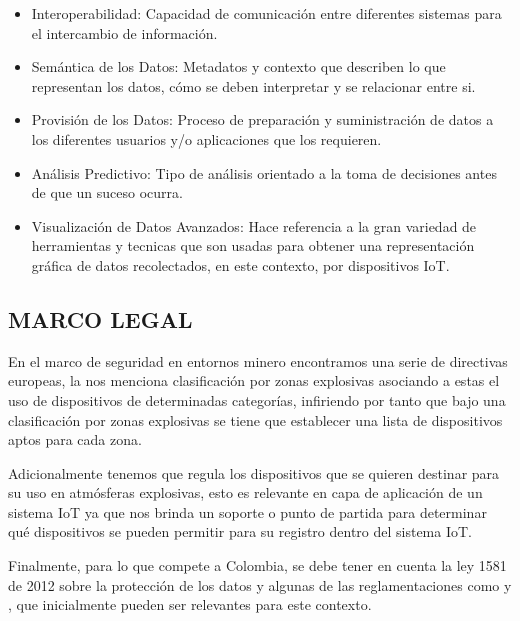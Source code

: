 \documentclass[stu,12pt,floatsintext]{apa7}
\begin{document}
\begin{itemize}
		\item Interoperabilidad: Capacidad de comunicación entre diferentes sistemas para el intercambio de información.
		\item Semántica de los Datos: Metadatos y contexto que describen lo que representan los datos, cómo se deben interpretar y se relacionar entre si.
		\item Provisión de los Datos: Proceso de preparación y suministración de datos a los diferentes usuarios y/o aplicaciones que los requieren.
		\item Análisis Predictivo: Tipo de análisis orientado a la toma de decisiones antes de que un suceso ocurra.
		\item Visualización de Datos Avanzados: Hace referencia a la gran variedad de herramientas y tecnicas que son usadas para obtener una representación gráfica de datos recolectados, en este contexto, por dispositivos IoT.
	\end{itemize}
	\subsection{MARCO LEGAL}
	En el marco de seguridad en entornos minero encontramos una serie de directivas europeas, la \cite{ATEX114Directive} nos menciona clasificación por zonas explosivas asociando a estas el uso de dispositivos de determinadas categorías, infiriendo por tanto que bajo una clasificación por zonas explosivas se tiene que establecer una lista de dispositivos aptos para cada zona.
	
	Adicionalmente tenemos \cite{Directive2014_34} que regula los dispositivos que se quieren destinar para su uso en atmósferas explosivas, esto es relevante en capa de aplicación de un sistema IoT ya que nos brinda un soporte o punto de partida para determinar qué dispositivos se pueden permitir para su registro dentro del sistema IoT.
	
	Finalmente, para lo que compete a Colombia, se debe tener en cuenta la ley 1581 de 2012 sobre la protección de los datos \cite{ley_estatutaria_1581_2012} y algunas de las reglamentaciones como \cite{decreto_1377_2013} y \cite{decreto_255_2022}, que inicialmente pueden ser relevantes para este contexto.
	
\end{document}
